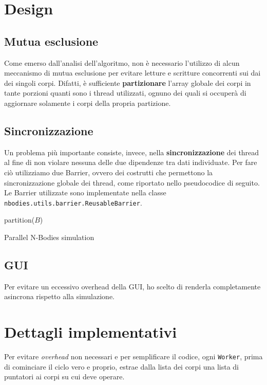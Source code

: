 \documentclass[12pt,a4paper,oneside]{article}
\begin{document}
	\section{Design}
	\subsection{Mutua esclusione}
	Come emerso dall'analisi dell'algoritmo, non è necessario l'utilizzo di alcun meccanismo di mutua esclusione per evitare letture e scritture concorrenti sui dai dei singoli corpi. Difatti, è sufficiente \textbf{partizionare} l'array globale dei corpi in tante porzioni quanti sono i thread utilizzati, ognuno dei quali si occuperà di aggiornare solamente i corpi della propria partizione.
	
	\subsection{Sincronizzazione}
	Un problema più importante consiste, invece, nella \textbf{sincronizzazione} dei thread al fine di non violare nessuna delle due dipendenze tra dati individuate. Per fare ciò utilizziamo due Barrier, ovvero dei costrutti che permettono la sincronizzazione globale dei thread, come riportato nello pseudocodice di seguito. Le Barrier utilizzate sono implementate nella classe \texttt{nbodies.utils.barrier.ReusableBarrier}.
	
	\begin{algorithm}
		
		partition($B$)\;
		\caption{Parallel N-Bodies simulation}
		\label{alg:sim-barrier}
	\end{algorithm}

	\subsection{GUI}
	Per evitare un eccessivo overhead della GUI, ho scelto di renderla completamente asincrona rispetto alla simulazione.
	
	\section{Dettagli implementativi}
	Per evitare \textit{overhead} non necessari e per semplificare il codice, ogni \texttt{Worker}, prima di cominciare il ciclo vero e proprio, estrae dalla lista dei corpi una lista di puntatori ai corpi su cui deve operare.
	
\end{document}
